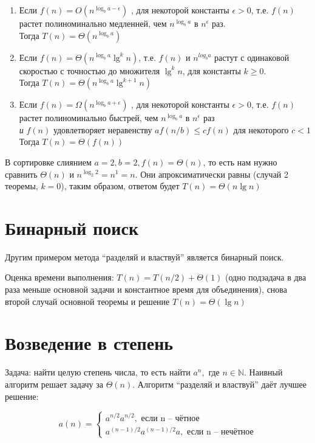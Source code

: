 \documentclass[a4paper,11pt]{article}
\begin{document}
\begin{enumerate}
\item Если $f(n) = O(n^{\log_{b}{a - \epsilon}})$ , для некоторой константы
  $\epsilon > 0$, т.е. $f(n)$ растет полиноминально медленней, чем
  $n^{\log_b a}$ в $n^\epsilon$ раз.\\
  Тогда $T(n) = \Theta(n^{\log_b a})$

\item Если $f(n) = \Theta(n^{\log_b a}\lg^k n)$, т.е. $f(n)$ и $n^{log_b a}$
  растут с одинаковой скоростью с точностью до множителя $\lg^k n$, для
  константы $k \geqslant 0$.\\ Тогда $T(n) = \Theta(n^{\log_b a} \lg^{k+1} n)$

\item Если $f(n) = \Omega(n^{\log_b{a + \epsilon}})$ , для некоторой константы
  $\epsilon > 0$, т.е. $f(n)$ растет полиноминально быстрей, чем $n^{\log_b a}$
  в $n^\epsilon$ раз \\ \emph{и} $f(n)$ удовлетворяет неравенству $a f(n/b)
  \leqslant c f(n)$ для некоторого $c < 1$ \\ Тогда $T(n) = \Theta(f(n))$
\end{enumerate}

В сортировке слиянием $a = 2, b = 2, f(n) = \Theta(n)$, то есть нам нужно
сравнить $\Theta(n)$ и $n^{\log_2 2} = n^1 = n$. Они апроксиматически равны
(случай 2 теоремы, $k = 0$), таким образом, ответом будет $T(n) = \Theta(n \lg
n)$

\section{Бинарный поиск}
Другим примером метода ``разделяй и властвуй'' является бинарный поиск.

Оценка времени выполнения: $T(n) = T(n/2) + \Theta(1)$ (одно подзадача в два
раза меньше основной задачи и константное время для объединения), снова второй
случай основной теоремы и решение $T(n) = \Theta(\lg n)$

\section{Возведение в степень}
Задача: найти целую степень числа, то есть найти $a^n, \text{ где } n \in
\mathbb{N}$. Наивный алгоритм решает задачу за  $\Theta(n)$. Алгоритм ``разделяй
и властвуй'' даёт лучшее решение:

\begin{equation*}
  a(n) = \begin{cases}
    a^{n/2} a^{n/2}, \text{ если n -- чётное} \\
    a^{(n-1)/2} a^{(n-1)/2} a,  \text{ если n -- нечётное}
  \end{cases}
\end{equation*}
\end{document}
